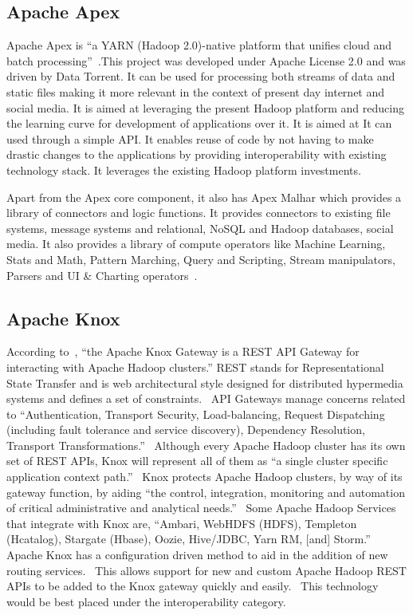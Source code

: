 {\subsection{Apache Apex}
     
Apache Apex is ``a YARN (Hadoop 2.0)-native platform that unifies
cloud and batch processing''~\cite{www-apacheapexwiki}.This project
was developed under Apache License 2.0 and was driven by Data
Torrent. It can be used for processing both streams of data and static
files making it more relevant in the context of present day internet
and social media. It is aimed at leveraging the present Hadoop
platform and reducing the learning curve for development of
applications over it. It is aimed at It can used through a simple
API. It enables reuse of code by not having to make drastic changes to
the applications by providing interoperability with existing
technology stack. It leverages the existing Hadoop platform
investments.

Apart from the Apex core component, it also has Apex Malhar which
provides a library of connectors and logic functions. It provides
connectors to existing file systems, message systems and relational,
NoSQL and Hadoop databases, social media. It also provides a library
of compute operators like Machine Learning, Stats and Math, Pattern
Marching, Query and Scripting, Stream manipulators, Parsers and UI \&
Charting operators~\cite{www-apacheapexblog}.

\subsection{Apache Knox \cv}

According to~\cite{knox}, ``the Apache Knox Gateway is a REST API
Gateway for interacting with Apache Hadoop clusters.'' REST stands for
Representational State Transfer and is web architectural style
designed for distributed hypermedia systems and defines a set of
constraints.~\cite{fielding} API Gateways manage concerns related to
``Authentication, Transport Security, Load-balancing, Request
Dispatching (including fault tolerance and service discovery),
Dependency Resolution, Transport Transformations.''~\cite{peyrott}
Although every Apache Hadoop cluster has its own set of REST APIs,
Knox will represent all of them as ``a single cluster specific
application context path.''~\cite{knox} Knox protects Apache Hadoop
clusters, by way of its gateway function, by aiding ``the control,
integration, monitoring and automation of critical administrative and
analytical needs.''~\cite{knox} Some Apache Hadoop Services that
integrate with Knox are, ``Ambari, WebHDFS (HDFS), Templeton
(Hcatalog), Stargate (Hbase), Oozie, Hive/JDBC, Yarn RM, [and]
Storm.''~\cite{knox} Apache Knox has a configuration driven method to
aid in the addition of new routing services.~\cite{knox} This allows
support for new and custom Apache Hadoop REST APIs to be added to the
Knox gateway quickly and easily.~\cite{knox} This technology would be
best placed under the interoperability category.

}
